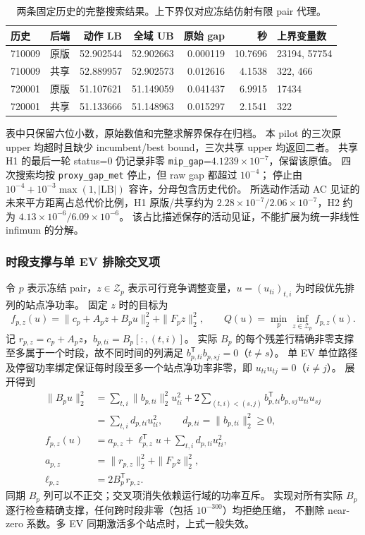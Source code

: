\documentclass[UTF8,fontset=fandol,11pt,a4paper]{ctexart}
\begin{document}
\begin{table}[htbp]
\centering\small
\caption{两条固定历史的完整搜索结果。上下界仅对应冻结仿射有限 pair 代理。}
\label{tab:shared-upper-search}
\begin{tabular}{llrrrrl}
\hline
历史 & 后端 & 动作 LB & 全域 UB & 原始 gap & 秒 & 上界变量数 \\
\hline
710009 & 原版 & 52.902544 & 52.902663 & 0.000119 & 10.7696 & 23194, 57754 \\
710009 & 共享 & 52.889957 & 52.902573 & 0.012616 & 4.1538 & 322, 466 \\
720001 & 原版 & 51.107621 & 51.149059 & 0.041437 & 6.9915 & 17434 \\
720001 & 共享 & 51.133666 & 51.148963 & 0.015297 & 2.1541 & 322 \\
\hline
\end{tabular}
\end{table}

表中只保留六位小数，原始数值和完整求解界保存在归档。
本 pilot 的三次原 upper 均超时且缺少 incumbent/best bound，三次共享 upper 均返回二者。
共享 H1 的最后一轮 status=0 仍记录非零 \texttt{mip\_gap}=$4.1239\times10^{-7}$，保留该原值。
四次搜索均按 \texttt{proxy\_gap\_met} 停止，但 raw gap 都超过 $10^{-4}$；
停止由 $10^{-4}+10^{-3}\max(1,|\mathrm{LB}|)$ 容许，分母包含历史代价。
所选动作活动 AC 见证的未来平方距离占总代价比例，H1 原版/共享约为
$2.28\times10^{-7}/2.06\times10^{-7}$，H2 约为 $4.13\times10^{-6}/6.09\times10^{-6}$。
该占比描述保存的活动见证，不能扩展为统一非线性 infimum 的分解。

\subsubsection{时段支撑与单 EV 排除交叉项}
令 $p$ 表示冻结 pair，$z\in\mathcal Z_p$ 表示可行竞争调整变量，$u=(u_{ti})_{t,i}$ 为时段优先排列的站点净功率。
固定 $z$ 时的目标为
\begin{equation}
 f_{p,z}(u)=\|c_p+A_pz+B_pu\|_2^2+\|F_pz\|_2^2,
 \qquad Q(u)=\min_p\inf_{z\in\mathcal Z_p}f_{p,z}(u).
\end{equation}
记 $r_{p,z}=c_p+A_pz$，$b_{p,ti}=B_p[:,(t,i)]$。
实际 $B_p$ 的每个残差行精确非零支撑至多属于一个时段，故不同时间的列满足
$b_{p,ti}^{\mathsf T}b_{p,sj}=0$（$t\ne s$）。
单 EV 单位路径及停留功率绑定保证每时段至多一个站点净功率非零，即
$u_{ti}u_{tj}=0$（$i\ne j$）。
展开得到
\begin{align}
 \|B_pu\|_2^2
 &=\sum_{t,i}\|b_{p,ti}\|_2^2u_{ti}^2
   +2\!\sum_{(t,i)<(s,j)}b_{p,ti}^{\mathsf T}b_{p,sj}u_{ti}u_{sj}\\
 &=\sum_{t,i}d_{p,ti}u_{ti}^2,\qquad d_{p,ti}=\|b_{p,ti}\|_2^2\ge0,\\
 f_{p,z}(u)&=a_{p,z}+\ell_{p,z}^{\mathsf T}u+\sum_{t,i}d_{p,ti}u_{ti}^2,\\
 a_{p,z}&=\|r_{p,z}\|_2^2+\|F_pz\|_2^2,\\
 \ell_{p,z}&=2B_p^{\mathsf T}r_{p,z}.
\end{align}
同期 $B_p$ 列可以不正交；交叉项消失依赖运行域的功率互斥。
实现对所有实际 $B_p$ 逐行检查精确支撑，任何跨时段非零（包括 $10^{-300}$）均拒绝压缩，
不删除 near-zero 系数。多 EV 同期激活多个站点时，上式一般失效。
\end{document}

